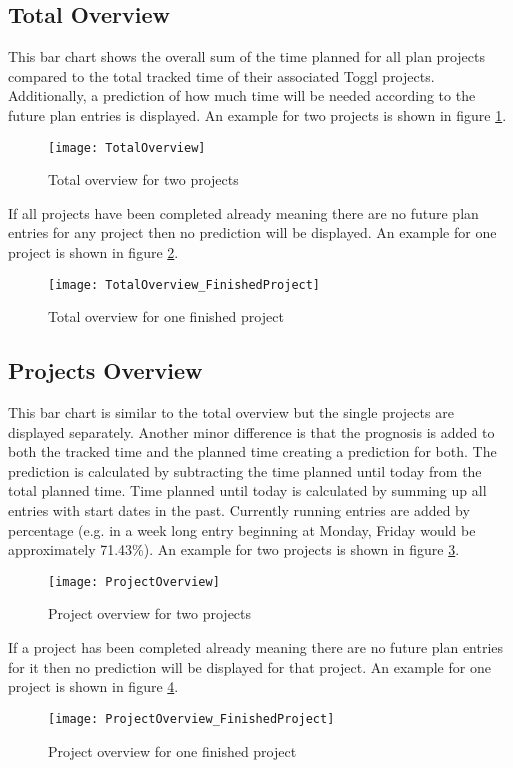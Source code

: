 \subsection{Total Overview}
This bar chart shows the overall sum of the time planned for all plan projects compared to the total tracked time of their associated Toggl projects. Additionally, a prediction of how much time will be needed according to the future plan entries is displayed. An example for two projects is shown in figure \ref{totalOverview}.
\begin{figure}[H]
	\centering
	\texttt{[image: TotalOverview]}
	\caption{Total overview for two projects}
	\label{totalOverview}
\end{figure}
If all projects have been completed already meaning there are no future plan entries for any project then no prediction will be displayed. An example for one project is shown in figure \ref{totalOverviewFinished}.
\begin{figure}[H]
	\centering
	\texttt{[image: TotalOverview\_FinishedProject]}
	\caption{Total overview for one finished project}
	\label{totalOverviewFinished}
\end{figure}

\subsection{Projects Overview}
This bar chart is similar to the total overview but the single projects are displayed separately. Another minor difference is that the prognosis is added to both the tracked time and the planned time creating a prediction for both. The prediction is calculated by subtracting the time planned until today from the total planned time. Time planned until today is calculated by summing up all entries with start dates in the past. Currently running entries are added by percentage (e.g. in a week long entry beginning at Monday, Friday would be approximately 71.43\%). An example for two projects is shown in figure \ref{projectOverview}.
\begin{figure}[H]
	\centering
	\texttt{[image: ProjectOverview]}
	\caption{Project overview for two projects}
	\label{projectOverview}
\end{figure}
If a project has been completed already meaning there are no future plan entries for it then no prediction will be displayed for that project. An example for one project is shown in figure \ref{projectOverviewFinished}.
\begin{figure}[H]
	\centering
	\texttt{[image: ProjectOverview\_FinishedProject]}
	\caption{Project overview for one finished project}
	\label{projectOverviewFinished}
\end{figure}

